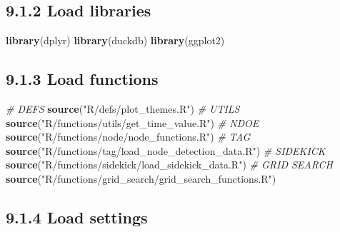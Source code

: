 \documentclass[
]{book}
\newenvironment{Shaded}{\begin{snugshade}}{\end{snugshade}}
\newcommand{\CommentTok}[1]{\textcolor[rgb]{0.56,0.35,0.01}{\textit{#1}}}
\newcommand{\FunctionTok}[1]{\textcolor[rgb]{0.13,0.29,0.53}{\textbf{#1}}}
\newcommand{\NormalTok}[1]{#1}
\newcommand{\StringTok}[1]{\textcolor[rgb]{0.31,0.60,0.02}{#1}}
\begin{document}
\subsection{9.1.2 Load libraries}\label{load-libraries}

\begin{Shaded}
\begin{Highlighting}[]
\FunctionTok{library}\NormalTok{(dplyr)}
\FunctionTok{library}\NormalTok{(duckdb)}
\FunctionTok{library}\NormalTok{(ggplot2)}
\end{Highlighting}
\end{Shaded}

\subsection{9.1.3 Load functions}\label{load-functions-1}

\begin{Shaded}
\begin{Highlighting}[]
\CommentTok{\# DEFS}
\FunctionTok{source}\NormalTok{(}\StringTok{"R/defs/plot\_themes.R"}\NormalTok{)}
\CommentTok{\# UTILS}
\FunctionTok{source}\NormalTok{(}\StringTok{"R/functions/utils/get\_time\_value.R"}\NormalTok{)}
\CommentTok{\# NDOE}
\FunctionTok{source}\NormalTok{(}\StringTok{"R/functions/node/node\_functions.R"}\NormalTok{)}
\CommentTok{\# TAG}
\FunctionTok{source}\NormalTok{(}\StringTok{"R/functions/tag/load\_node\_detection\_data.R"}\NormalTok{)}
\CommentTok{\# SIDEKICK}
\FunctionTok{source}\NormalTok{(}\StringTok{"R/functions/sidekick/load\_sidekick\_data.R"}\NormalTok{)}
\CommentTok{\# GRID SEARCH}
\FunctionTok{source}\NormalTok{(}\StringTok{"R/functions/grid\_search/grid\_search\_functions.R"}\NormalTok{)}
\end{Highlighting}
\end{Shaded}

\subsection{9.1.4 Load settings}\label{load-settings-3}
\end{document}
